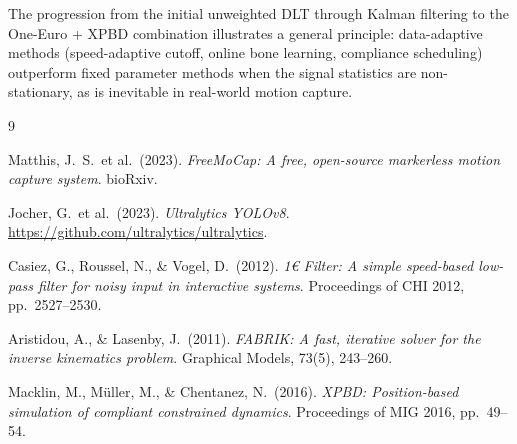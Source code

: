 \documentclass[11pt,a4paper]{article}
\begin{document}
The progression from the initial unweighted DLT through Kalman filtering to the
One-Euro + XPBD combination illustrates a general principle: data-adaptive methods
(speed-adaptive cutoff, online bone learning, compliance scheduling) outperform fixed
parameter methods when the signal statistics are non-stationary, as is inevitable in
real-world motion capture.

\begin{thebibliography}{9}

Matthis, J.\ S.\ et al.\ (2023).
\textit{FreeMoCap: A free, open-source markerless motion capture system}.
bioRxiv.

Jocher, G.\ et al.\ (2023).
\textit{Ultralytics YOLOv8}.
\url{https://github.com/ultralytics/ultralytics}.

Casiez, G., Roussel, N., \& Vogel, D.\ (2012).
\textit{1€ Filter: A simple speed-based low-pass filter for noisy input in interactive systems}.
Proceedings of CHI 2012, pp.\ 2527--2530.

Aristidou, A., \& Lasenby, J.\ (2011).
\textit{FABRIK: A fast, iterative solver for the inverse kinematics problem}.
Graphical Models, 73(5), 243--260.

Macklin, M., M\"uller, M., \& Chentanez, N.\ (2016).
\textit{XPBD: Position-based simulation of compliant constrained dynamics}.
Proceedings of MIG 2016, pp.\ 49--54.

\end{thebibliography}
\end{document}
